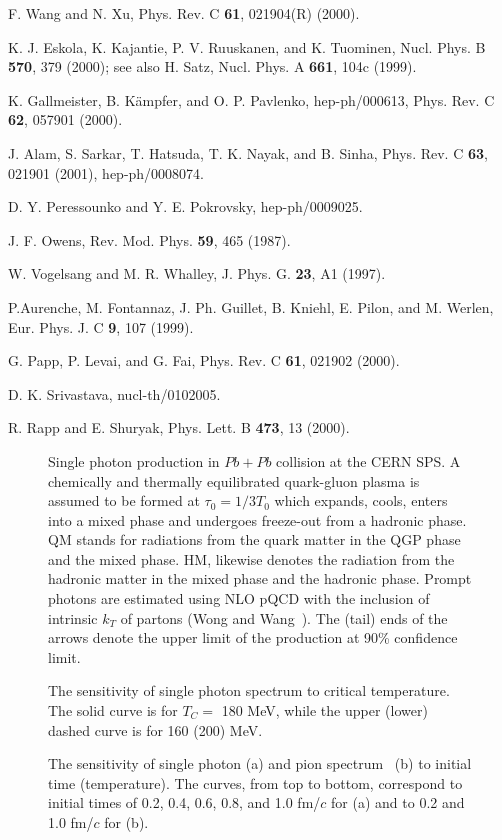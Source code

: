 \begin{references}
 F. Wang and N. Xu, Phys. Rev. C {\bf 61}, 021904(R) (2000).

 K. J. Eskola, K. Kajantie, P. V. Ruuskanen, and K. Tuominen,
Nucl. Phys. B {\bf 570}, 379 (2000); see also H. Satz, Nucl. Phys. A {\bf 661},
104c (1999).

 K. Gallmeister, B. K\"{a}mpfer, and O. P. Pavlenko,
hep-ph/000613, Phys. Rev. C {\bf 62}, 057901 (2000). 

 J. Alam, S. Sarkar, T. Hatsuda, T. K. Nayak,
and B. Sinha, Phys. Rev. C {\bf 63}, 021901 (2001), hep-ph/0008074.

 D. Y. Peressounko and Y. E. Pokrovsky, hep-ph/0009025.

 J. F. Owens, Rev. Mod. Phys. {\bf 59}, 465 (1987).

 W. Vogelsang and M. R. Whalley, J. Phys. G. {\bf 23},
                 A1 (1997). 

 P.Aurenche, M. Fontannaz, J. Ph. Guillet, B. Kniehl,
E. Pilon, and M. Werlen, Eur. Phys. J. C {\bf 9}, 107 (1999).

 G. Papp, P. Levai, and G. Fai, Phys. Rev. C {\bf 61}, 021902
(2000).

 D. K. Srivastava, nucl-th/0102005.

 R. Rapp and E. Shuryak, Phys. Lett. B {\bf 473}, 13 (2000).

\end{references}


\begin{figure}
\epsfxsize=3.25in
\caption{
 Single photon production in $Pb+Pb$ collision at the CERN SPS.
A chemically and thermally equilibrated quark-gluon plasma is assumed
to be formed at $\tau_0=1/3T_0$ which expands, cools, enters into a
mixed phase and undergoes freeze-out from a hadronic phase.
 QM stands for radiations from the
quark matter in the QGP phase and the mixed phase. HM, likewise denotes
the radiation from the hadronic matter in the mixed phase and the
hadronic phase. 
Prompt photons are estimated
using NLO pQCD with the inclusion of
intrinsic \protect$k_T$ of partons (Wong and Wang~\protect\cite{wong}).
The (tail) ends of the arrows denote the upper limit of the production
at 90\% confidence limit.
}
\end{figure}

\begin{figure}
\epsfxsize=3.25in
\caption{
The sensitivity of single photon spectrum to critical
temperature. The solid curve is for $T_C=$ 180 MeV, while the
upper (lower) dashed curve is for 160 (200) MeV.
}
\end{figure}

\begin{figure}
\epsfxsize=3.25in
\caption{
 The sensitivity of single photon (a) and pion 
 spectrum~\protect\cite{wa98pi} (b) to initial
time (temperature). The curves, from top to bottom, correspond to
initial times of 0.2, 0.4, 0.6, 0.8, and 1.0 fm/$c$ for (a) and to
0.2 and 1.0 fm/$c$ for (b).
}
\end{figure}




